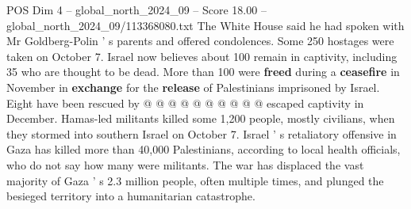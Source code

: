 \begin{textsample}{POS Dim 4 – global\_north\_2024\_09 – Score 18.00 – global\_north\_2024\_09/113368080.txt}
The White House said he had spoken with Mr Goldberg-Polin ' s parents and offered condolences.
Some 250 hostages were taken on October 7.
Israel now believes about 100 remain in captivity, including 35 who are thought to be dead.
More than 100 were \textbf{freed} during a \textbf{ceasefire} in November in \textbf{exchange} for the \textbf{release} of Palestinians imprisoned by Israel.
Eight have been rescued by @ @ @ @ @ @ @ @ @ @ escaped captivity in December.
Hamas-led militants killed some 1,200 people, mostly civilians, when they stormed into southern Israel on October 7.
Israel ' s retaliatory offensive in Gaza has killed more than 40,000 Palestinians, according to local health officials, who do not say how many were militants.
The war has displaced the vast majority of Gaza ' s 2.3 million people, often multiple times, and plunged the besieged territory into a humanitarian catastrophe.

\end{textsample}
